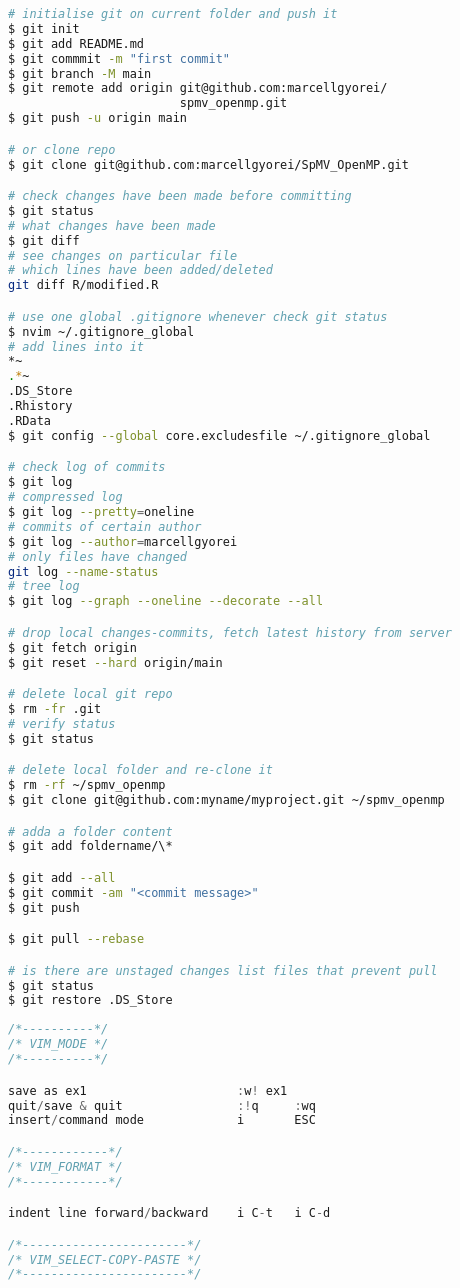 \documentclass[8pt]{extarticle}
\begin{document}
\begin{small}
\begin{multicols}{2}
\begin{lstlisting}[language=bash]
# initialise git on current folder and push it
$ git init
$ git add README.md
$ git commmit -m "first commit"
$ git branch -M main
$ git remote add origin git@github.com:marcellgyorei/
						spmv_openmp.git
$ git push -u origin main

# or clone repo
$ git clone git@github.com:marcellgyorei/SpMV_OpenMP.git

# check changes have been made before committing
$ git status
# what changes have been made
$ git diff
# see changes on particular file
# which lines have been added/deleted
git diff R/modified.R

# use one global .gitignore whenever check git status
$ nvim ~/.gitignore_global
# add lines into it
*~
.*~
.DS_Store
.Rhistory
.RData
$ git config --global core.excludesfile ~/.gitignore_global

# check log of commits
$ git log
# compressed log
$ git log --pretty=oneline
# commits of certain author
$ git log --author=marcellgyorei
# only files have changed
git log --name-status
# tree log
$ git log --graph --oneline --decorate --all

# drop local changes-commits, fetch latest history from server
$ git fetch origin
$ git reset --hard origin/main

# delete local git repo
$ rm -fr .git
# verify status
$ git status

# delete local folder and re-clone it
$ rm -rf ~/spmv_openmp
$ git clone git@github.com:myname/myproject.git ~/spmv_openmp

# adda a folder content
$ git add foldername/\*

$ git add --all
$ git commit -am "<commit message>"
$ git push

$ git pull --rebase

# is there are unstaged changes list files that prevent pull
$ git status
$ git restore .DS_Store


\end{lstlisting}

\begin{lstlisting}[language=C]
/*----------*/
/* VIM_MODE */
/*----------*/

save as ex1    					:w! ex1
quit/save & quit				:!q		:wq
insert/command mode				i		ESC

/*------------*/
/* VIM_FORMAT */
/*------------*/

indent line forward/backward 	i C-t	i C-d		

/*-----------------------*/
/* VIM_SELECT-COPY-PASTE */
/*-----------------------*/


\end{lstlisting}
\end{multicols}
\end{small}
\end{document}
